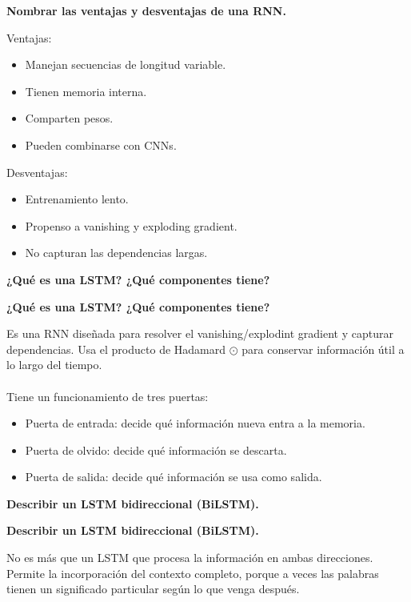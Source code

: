 \documentclass[10pt]{memoir}
\begin{document}
\clearpage
\begin{center}
	\textbf{\Large Nombrar las ventajas y desventajas de una RNN.}
\end{center}
\noindent Ventajas:
\begin{itemize}
	\item Manejan secuencias de longitud variable.
	\item Tienen memoria interna.
	\item Comparten pesos.
	\item Pueden combinarse con CNNs.
\end{itemize}
\noindent Desventajas:
\begin{itemize}
	\item Entrenamiento lento.
	\item Propenso a vanishing y exploding gradient.
	\item No capturan las dependencias largas.
\end{itemize}

\clearpage
\begin{center}
	\textbf{\Large ¿Qué es una LSTM? ¿Qué componentes tiene?}
\end{center}

\clearpage
\begin{center}
	\textbf{\Large ¿Qué es una LSTM? ¿Qué componentes tiene?}
\end{center}
\noindent Es una RNN diseñada para resolver el vanishing/explodint gradient y capturar dependencias. Usa el producto de Hadamard $\odot$ para conservar información útil a lo largo del tiempo. \\
\\
\noindent Tiene un funcionamiento de tres puertas:
\begin{itemize}
	\item Puerta de entrada: decide qué información nueva entra a la memoria.
	\item Puerta de olvido: decide qué información se descarta.
	\item Puerta de salida: decide qué información se usa como salida.
\end{itemize}

\clearpage
\begin{center}
	\textbf{\Large Describir un LSTM bidireccional (BiLSTM).}
\end{center}

\clearpage
\begin{center}
	\textbf{\Large Describir un LSTM bidireccional (BiLSTM).}
\end{center}
\noindent No es más que un LSTM que procesa la información en ambas direcciones. Permite la incorporación del contexto completo, porque a veces las palabras tienen un significado particular según lo que venga después.
\end{document}
